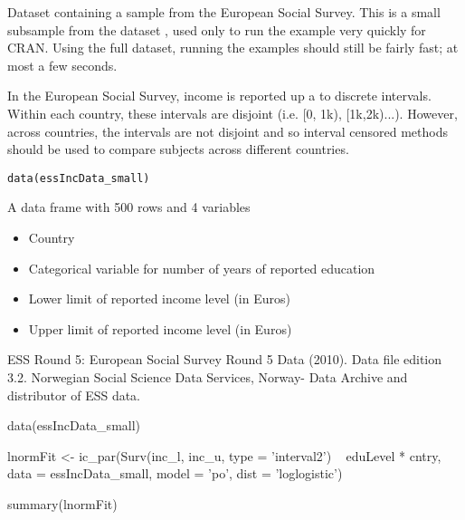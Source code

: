\documentclass[a4paper]{book}
\begin{document}
%
\begin{Description}\relax
 
Dataset containing a sample from the European Social Survey. This is a small subsample from the dataset , used only to run the example very quickly for CRAN. Using the full dataset, running the examples should still be fairly fast; at most a few seconds. 

In the European Social Survey, income is reported up a to discrete intervals. Within each country, these intervals are disjoint (i.e. [0, 1k), [1k,2k)...). However, across countries, the intervals are not disjoint and so interval censored methods should be used to compare subjects across different countries.

\end{Description}
%
\begin{Usage}
\begin{verbatim}
data(essIncData_small)
\end{verbatim}
\end{Usage}
%
\begin{Format}
A data frame with 500 rows and 4 variables	
\begin{itemize}

\item {}   Country
\item {}   Categorical variable for number of years of reported education
\item {}   Lower limit of reported income level (in Euros)
\item {}   Upper limit of reported income level (in Euros)

\end{itemize}

\end{Format}
%
\begin{Source}\relax
ESS Round 5: European Social Survey Round 5 Data (2010). Data file edition 3.2. Norwegian Social Science Data Services, Norway\bsl{}- Data Archive and distributor of ESS data.
\end{Source}
%
\begin{Examples}
\begin{ExampleCode}
	data(essIncData_small)
	
	lnormFit <- ic_par(Surv(inc_l, inc_u, type = 'interval2') ~ eduLevel * cntry, 	
	                   data = essIncData_small,
	                   model = 'po',
	                   dist = 'loglogistic')
	
	summary(lnormFit)
\end{ExampleCode}
\end{Examples}
\end{document}
